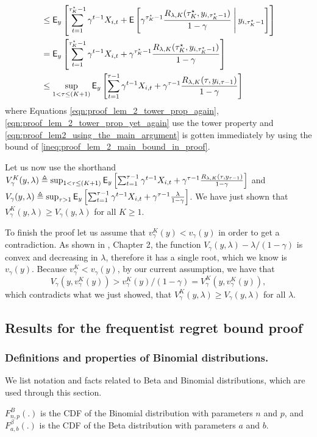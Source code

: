 \begin{myproof}[Proof.]
\begin{align}
	& \le  \E_{y}\left[\sum_{t=1}^{\tau^\star_K-1}\gamma^{t-1} X_{i,t} + \Ee{\gamma^{\tau^\star_K-1}  \frac{R_{\lambda,K}(\tau^\star_K, y_{i,\tau^\star_K-1})}{1-\gamma} \given[\Bigg] y_{i,\tau^\star_K-1}}\right] \label{eqn:proof_lem2_using_the_main_argument} \\
	& =  \E_{y}\left[\sum_{t=1}^{\tau^\star_K-1}\gamma^{t-1} X_{i,t} +  \gamma^{\tau^\star_K-1}  \frac{R_{\lambda,K}(\tau^\star_K, y_{i,\tau^\star_K-1})}{1-\gamma}\right] \label{eqn:proof_lem_2_tower_prop_yet_again} \\
	& \le \sup_{1 < \tau \le (K+1)}  \E_{y}\left[\sum_{t=1}^{\tau-1}\gamma^{t-1} X_{i,t} +  \gamma^{\tau-1}  \frac{R_{\lambda,K}(\tau, y_{i,\tau-1})}{1-\gamma}\right] \nonumber
	\end{align}
	where Equations \eqref{eqn:proof_lem_2_tower_prop_again}, \eqref{eqn:proof_lem_2_tower_prop_yet_again} use the tower property and \eqref{eqn:proof_lem2_using_the_main_argument} is gotten immediately by using the bound of \eqref{ineq:proof_lem_2_main_bound_in_proof}. 
	
	Let us now use the shorthand $V^K_{\gamma}( y, \lambda) \defeq \sup_{1 < \tau \le (K+1)} \E_{y}\left[\sum_{t=1}^{\tau-1}\gamma^{t-1} X_{i,t} + \gamma^{\tau-1} \frac{R_{\lambda,K}(\tau, y_{\tau-1})}{1-\gamma}\right]$ and $V_{\gamma}(y, \lambda) \defeq \sup_{\tau > 1} \E_{y}\left[\sum_{t=1}^{\tau-1}\gamma^{t-1} X_{i,t} +  \gamma^{\tau-1} \frac{\lambda}{1-\gamma}\right]$. We have just shown that $V^K_{\gamma}( y, \lambda) \ge V_{\gamma}(y, \lambda)$ for all $K \ge 1$. 
	
	To finish the proof let us assume that $v^K_\gamma(y) < v_\gamma(y)$ in order to get a contradiction. As shown in \cite{gittins2011multi}, Chapter 2, the function $V_\gamma(y, \lambda) - \lambda/(1-\gamma)$ is convex and decreasing in $\lambda$, therefore it has a single root, which we know is $v_\gamma(y)$. Because $v^K_\gamma < v_\gamma(y)$, by our current assumption, we have that 
	\begin{equation}
		V_\gamma(y, v^K_\gamma(y)) > v^K_\gamma(y)/(1-\gamma) = V^K_\gamma(y, v^K_\gamma(y)),
	\end{equation}
	which contradicts what we just showed, that $V^K_{\gamma}( y, \lambda) \ge V_{\gamma}(y, \lambda)$ for all $\lambda$.
\end{myproof}
\subsection{Results for the frequentist regret bound proof}
\subsubsection{Definitions and properties of Binomial distributions.}
We list notation and facts related to Beta and Binomial distributions, which are used through this section.
\begin{definition}
	$F^B_{n,p}(.)$ is the CDF of the Binomial distribution with parameters $n$ and $p$, and $F^\beta_{a,b}(.)$ is the CDF of the Beta distribution with parameters $a$ and $b$.
\end{definition}

